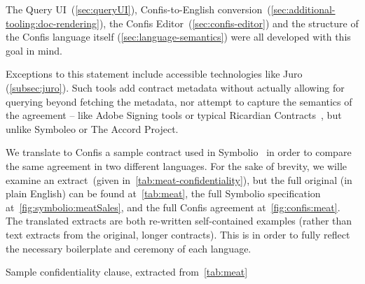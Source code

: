 The Query UI~(\autoref{sec:queryUI}), Confis-to-English conversion~(\autoref{sec:additional-tooling:doc-rendering}), the Confis Editor~(\autoref{sec:confis-editor}) and the structure of the Confis language itself (\autoref{sec:language-semantics}) were all developed with this goal in mind.

Exceptions to this statement include accessible technologies like Juro (\autoref{subsec:juro}).
Such tools add contract metadata without actually allowing for querying beyond fetching the metadata, nor attempt to capture the semantics of the agreement -- like Adobe Signing tools or typical Ricardian Contracts~\cite{ricardianWeb}, but unlike Symboleo or The Accord Project.

We translate to Confis a sample contract used in Symbolio~\cite{symboleo2020} in order to compare the same agreement in two different languages.
For the sake of brevity, we wille examine an extract~(given in~\autoref{tab:meat-confidentiality}), but the full original (in plain English) can be found at~\autoref{tab:meat}, the full Symbolio specification at~\autoref{fig:symbolio:meatSales}, and the full Confis agreement at~\autoref{fig:confis:meat}.
The translated extracts are both re-written self-contained examples (rather than text extracts from the original, longer contracts).
This is in order to fully reflect the necessary boilerplate and ceremony of each language.

\begin{table}[h]
    \centering
    \setlength{\fboxsep}{10pt}
    \caption[Sample confidentiality clause]{Sample confidentiality clause, extracted from~\autoref{tab:meat}}
    \label{tab:meat-confidentiality}
\end{table}

